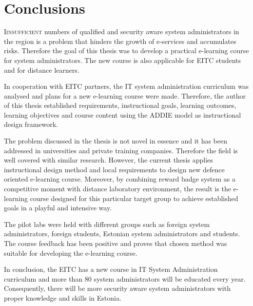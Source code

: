 \chapter{Conclusions}
\label{conclusion}
\lettrine[lraise=0.1, nindent=0em, slope=-.5em]{\color{Violet}I}{insufficient}  numbers of qualified and security aware system administrators in the region is a problem that hinders the growth of e-services and accumulates risks. Therefore the goal of this thesis was to develop a practical e-learning course for system administrators. The new course is also applicable for \gls{EITC} students and for distance learners. 

In cooperation with \gls{EITC} partners, the IT system administration curriculum was analysed and plans for a new e-learning course were made. Therefore, the author of this thesis established requirements, instructional goals, learning outcomes, learning objectives and course content using the \gls{ADDIE} model as instructional design framework.

The problem discussed in the thesis is not novel in essence and it has been addressed in universities and private training companies. Therefore the field is well covered with similar research. However, the current thesis applies instructional design method and local requirements to design new defence oriented e-learning course. Moreover, by combining reward badge system as a competitive moment with distance laboratory environment, the result is the e-learning course designed for this particular target group to achieve established goals in a playful and intensive way.

The pilot labs were held with different groups such as foreign system administrators, foreign students, Estonian system administrators and students. The course feedback has been positive and proves that chosen method was suitable for developing the e-learning course.


In conclusion, the \gls{EITC} has a new course in IT System Administration curriculum and more than 80 system administrators will be educated every year. Consequently,  there will be more security aware system administrators with proper knowledge and skills in Estonia.
